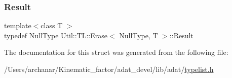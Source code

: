 \mbox{\label{structUtil_1_1TL_1_1Erase_3_01NullType_00_01T_01_4_a322fc628c66685b497fdb4d01f456b18}} 
\subsubsection{\texorpdfstring{Result}{Result}\hspace{0.1cm}{\footnotesize\ttfamily [2/2]}}
{\footnotesize\ttfamily template$<$class T $>$ \\
typedef \mbox{\hyperlink{classUtil_1_1NullType}{Null\+Type}} \mbox{\hyperlink{structUtil_1_1TL_1_1Erase}{Util\+::\+T\+L\+::\+Erase}}$<$ \mbox{\hyperlink{classUtil_1_1NullType}{Null\+Type}}, T $>$\+::\mbox{\hyperlink{structUtil_1_1TL_1_1Erase_3_01NullType_00_01T_01_4_a322fc628c66685b497fdb4d01f456b18}{Result}}}



The documentation for this struct was generated from the following file\+:\begin{DoxyCompactItemize}
\item 
/\+Users/archanar/\+Kinematic\+\_\+factor/adat\+\_\+devel/lib/adat/\mbox{\hyperlink{lib_2adat_2typelist_8h}{typelist.\+h}}\end{DoxyCompactItemize}
